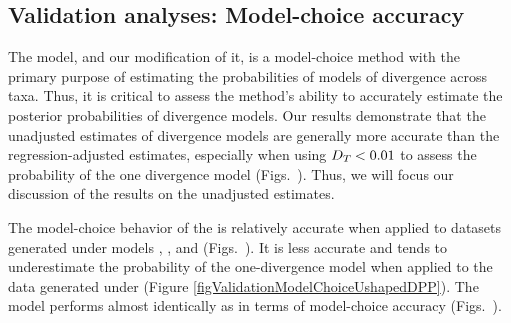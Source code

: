 \documentclass[letterpaper,12pt]{article}
\begin{document}
\begin{linenumbers}
\subsection*{Validation analyses: Model-choice accuracy}
The \msb model, and our modification of it, is a model-choice method
with the primary purpose of estimating the probabilities of models
of divergence across taxa.
Thus, it is critical to assess the method's ability to accurately
estimate the posterior probabilities of divergence models.
Our results demonstrate that the unadjusted estimates of divergence models are
generally more accurate than the regression-adjusted estimates, especially when
using $D_{T_{}} < 0.01$ to assess the probability of the one
divergence model (Figs.\
).
Thus, we will focus our discussion of the results on the unadjusted estimates.

The model-choice behavior of the \modelDPP is relatively accurate when applied
to datasets generated under models \modelDPP, \modelUniform, and \modelOld
(Figs.\
).
It is less accurate and tends to underestimate the probability of the
one-divergence model when applied to the data generated under \modelUshaped
(Figure \ref{figValidationModelChoiceUshapedDPP}).
The \modelUniform model performs almost identically as \modelDPP in
terms of model-choice accuracy (Figs.\
).


\end{linenumbers}
\end{document}
